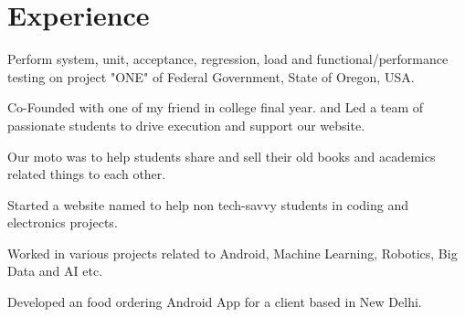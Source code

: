 \documentclass[]{deedy-resume-openfont}
\begin{document}
\begin{minipage}[t]{0.66\textwidth} 


\section{Experience}

\vspace{\topsep} %
\begin{tightemize}
\item Perform system, unit, acceptance, regression, load and functional/performance testing on project "ONE" of Federal Government, State of Oregon, USA.
\end{tightemize}
\sectionsep

\begin{tightemize}
\item Co-Founded  with one of my friend in college final year. and Led a team of passionate students to drive execution and support our website.
\item Our moto was to help students share and sell their old books and academics related things to each other.
\end{tightemize}
\sectionsep

\begin{tightemize}
\item Started a website named  to help non tech-savvy students in coding and electronics projects.
\item Worked in various projects related to Android, Machine Learning, Robotics, Big Data and AI etc.
\end{tightemize}
\sectionsep

\begin{tightemize}
\item Developed an food ordering Android App for a client based in New Delhi.
\end{tightemize}
\sectionsep


\end{minipage}
\end{document}
